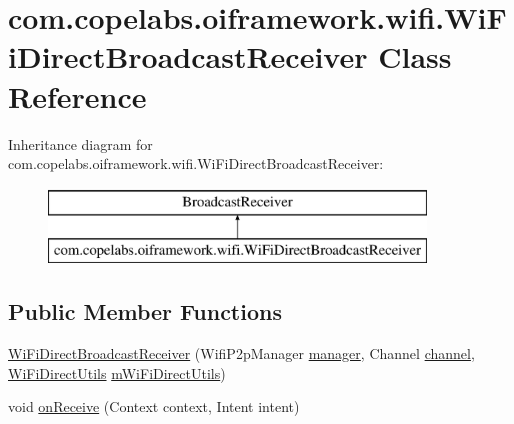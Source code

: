 \hypertarget{classcom_1_1copelabs_1_1oiframework_1_1wifi_1_1_wi_fi_direct_broadcast_receiver}{}\section{com.\+copelabs.\+oiframework.\+wifi.\+Wi\+Fi\+Direct\+Broadcast\+Receiver Class Reference}
\label{classcom_1_1copelabs_1_1oiframework_1_1wifi_1_1_wi_fi_direct_broadcast_receiver}
Inheritance diagram for com.\+copelabs.\+oiframework.\+wifi.\+Wi\+Fi\+Direct\+Broadcast\+Receiver\+:\begin{figure}[H]
\begin{center}
\leavevmode
\includegraphics[height=2.000000cm]{classcom_1_1copelabs_1_1oiframework_1_1wifi_1_1_wi_fi_direct_broadcast_receiver}
\end{center}
\end{figure}
\subsection*{Public Member Functions}
\begin{DoxyCompactItemize}
\item 
\hyperlink{classcom_1_1copelabs_1_1oiframework_1_1wifi_1_1_wi_fi_direct_broadcast_receiver_a0f137949e21d30ee4bd03fc644eac9f6}{Wi\+Fi\+Direct\+Broadcast\+Receiver} (Wifi\+P2p\+Manager \hyperlink{classcom_1_1copelabs_1_1oiframework_1_1wifi_1_1_wi_fi_direct_broadcast_receiver_a2edba703acb8c53fdc2240bcc7e9335d}{manager}, Channel \hyperlink{classcom_1_1copelabs_1_1oiframework_1_1wifi_1_1_wi_fi_direct_broadcast_receiver_a473acb917add689a28682aa22cee8237}{channel}, \hyperlink{classcom_1_1copelabs_1_1oiframework_1_1wifi_1_1_wi_fi_direct_utils}{Wi\+Fi\+Direct\+Utils} \hyperlink{classcom_1_1copelabs_1_1oiframework_1_1wifi_1_1_wi_fi_direct_broadcast_receiver_a1a6dfa8aeb56af5456fc35250c9ddaee}{m\+Wi\+Fi\+Direct\+Utils})
\item 
void \hyperlink{classcom_1_1copelabs_1_1oiframework_1_1wifi_1_1_wi_fi_direct_broadcast_receiver_a126cb061d1fa1ba0fdd6fa9b4726f7bb}{on\+Receive} (Context context, Intent intent)
\end{DoxyCompactItemize}
